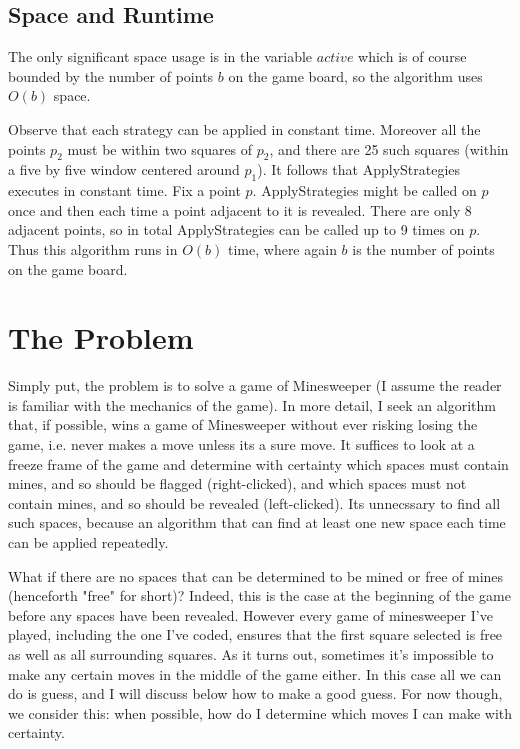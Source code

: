 \documentclass{article}
\theoremstyle{definition}
\theoremstyle{definition}
\theoremstyle{theorem}
\begin{document}
	\subsection*{Space and Runtime}
	The only significant space usage is in the variable $active$ which is of course bounded by the number of points $b$ on the game board, so the algorithm uses $O(b)$ space.
	
	Observe that each strategy can be applied in constant time. Moreover all the points $p_2$ must be within two squares of $p_2$, and there are 25 such squares (within a five by five window centered around $p_1$). It follows that ApplyStrategies executes in constant time. Fix a point $p$. ApplyStrategies might be called on $p$ once and then each time a point adjacent to it is revealed. There are only 8 adjacent points, so in total ApplyStrategies can be called up to 9 times on $p$. Thus this algorithm runs in $O(b)$ time, where again $b$ is the number of points on the game board.
	
	
	
	\section*{The Problem}
	Simply put, the problem is to solve a game of Minesweeper (I assume the reader is familiar with the mechanics of the game). In more detail, I seek an algorithm that, if possible, wins a game of Minesweeper without ever risking losing the game, i.e. never makes a move unless its a sure move. It suffices to look at a freeze frame of the game and determine with certainty which spaces must contain mines, and so should be flagged (right-clicked), and which spaces must not contain mines, and so should be revealed (left-clicked). Its unnecssary to find all such spaces, because an algorithm that can find at least one new space each time can be applied repeatedly.
	
	What if there are no spaces that can be determined to be mined or free of mines (henceforth "free" for short)? Indeed, this is the case at the beginning of the game before any spaces have been revealed. However every game of minesweeper I've played, including the one I've coded, ensures that the first square selected is free as well as all surrounding squares. As it turns out, sometimes it's impossible to make any certain moves in the middle of the game either. In this case all we can do is guess, and I will discuss below how to make a good guess. For now though, we consider this: when possible, how do I determine which moves I can make with certainty.
	
\end{document}
